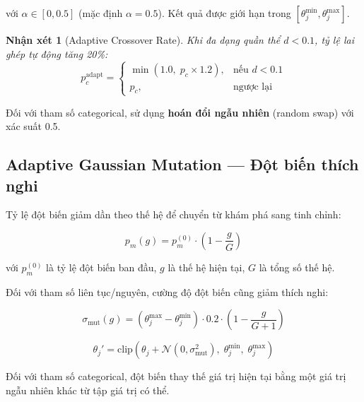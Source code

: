 \documentclass[12pt,a4paper]{article}
\newtheorem{remark}{Nhận xét}[section]
\begin{document}
\noindent với $\alpha \in [0, 0.5]$ (mặc định $\alpha = 0.5$). Kết quả được
giới hạn trong $[\theta_j^{\min}, \theta_j^{\max}]$.

\begin{remark}[Adaptive Crossover Rate]
Khi đa dạng quần thể $d < 0.1$, tỷ lệ lai ghép tự động tăng 20\%:
\begin{equation}
    p_c^{\text{adapt}} =
    \begin{cases}
        \min(1.0,\; p_c \times 1.2), & \text{nếu } d < 0.1 \\
        p_c, & \text{ngược lại}
    \end{cases}
    \label{eq:adaptive_crossover}
\end{equation}
\end{remark}

Đối với tham số categorical, sử dụng \textbf{hoán đổi ngẫu nhiên} (random swap)
với xác suất 0.5.

\subsection{Adaptive Gaussian Mutation --- Đột biến thích nghi}

Tỷ lệ đột biến giảm dần theo thế hệ để chuyển từ khám phá sang tinh chỉnh:

\begin{equation}
    p_m(g) = p_m^{(0)} \cdot \left(1 - \frac{g}{G}\right)
    \label{eq:adaptive_mutation_rate}
\end{equation}

\noindent với $p_m^{(0)}$ là tỷ lệ đột biến ban đầu, $g$ là thế hệ hiện tại,
$G$ là tổng số thế hệ.

Đối với tham số liên tục/nguyên, cường độ đột biến cũng giảm thích nghi:

\begin{equation}
    \sigma_{\text{mut}}(g) = (\theta_j^{\max} - \theta_j^{\min}) \cdot
    0.2 \cdot \left(1 - \frac{g}{G + 1}\right)
    \label{eq:mutation_strength}
\end{equation}

\begin{equation}
    \theta_j' = \text{clip}\!\left(
        \theta_j + \mathcal{N}(0, \sigma_{\text{mut}}^2),\;
        \theta_j^{\min},\; \theta_j^{\max}
    \right)
    \label{eq:gaussian_mutation}
\end{equation}

Đối với tham số categorical, đột biến thay thế giá trị hiện tại bằng một giá
trị ngẫu nhiên khác từ tập giá trị có thể.
\end{document}

